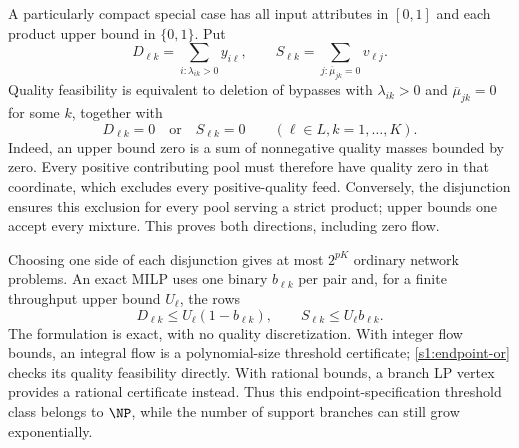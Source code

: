 A particularly compact special case has all input attributes in $[0,1]$
and each product upper bound in $\{0,1\}$. Put
\[
 D_{\ell k}=\sum_{i:\lambda_{ik}>0}y_{i\ell},\qquad
 S_{\ell k}=\sum_{j:\overline\mu_{jk}=0}v_{\ell j}.
\]
Quality feasibility is equivalent to deletion of bypasses with
$\lambda_{ik}>0$ and $\overline\mu_{jk}=0$ for some $k$, together with
\begin{equation}
 D_{\ell k}=0\quad\text{or}\quad S_{\ell k}=0
             \qquad(\ell\in L, k=1,\ldots,K).\label{s1:endpoint-or}
\end{equation}
Indeed, an upper bound zero is a sum of nonnegative quality masses
bounded by zero. Every positive contributing pool must therefore have
quality zero in that coordinate, which excludes every positive-quality
feed. Conversely, the disjunction ensures this exclusion for every
pool serving a strict product; upper bounds one accept every mixture.
This proves both directions, including zero flow.

Choosing one side of each disjunction gives at most $2^{pK}$ ordinary
network problems. An exact MILP uses one binary $b_{\ell k}$ per pair
and, for a finite throughput upper bound $U_\ell$, the rows
\[
 D_{\ell k}\le U_\ell(1-b_{\ell k}),\qquad
 S_{\ell k}\le U_\ell b_{\ell k}.
\]
The formulation is exact, with no quality discretization. With integer
flow bounds, an integral flow is a polynomial-size threshold certificate;
\eqref{s1:endpoint-or} checks its quality feasibility directly. With
rational bounds, a branch LP vertex provides a rational certificate
instead. Thus this endpoint-specification threshold class belongs to
$\NP$, while the number of support branches can still grow exponentially.
